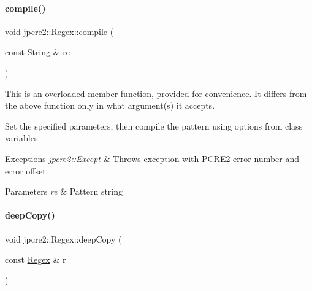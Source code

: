\paragraph{\texorpdfstring{compile()}{compile()}\hspace{0.1cm}{\footnotesize\ttfamily [5/5]}}
{\footnotesize\ttfamily void jpcre2\+::\+Regex\+::compile (\begin{DoxyParamCaption}\item[{const \hyperlink{namespacejpcre2_a91f03070152fb228bc116c5a737f1d16}{String} \&}]{re }\end{DoxyParamCaption})\hspace{0.3cm}{\ttfamily [inline]}}



This is an overloaded member function, provided for convenience. It differs from the above function only in what argument(s) it accepts. 

Set the specified parameters, then compile the pattern using options from class variables. 
\begin{DoxyExceptions}{Exceptions}
{\em \hyperlink{classjpcre2_1_1Except}{jpcre2\+::\+Except}} & Throws exception with P\+C\+R\+E2 error number and error offset \\
\hline
\end{DoxyExceptions}

\begin{DoxyParams}{Parameters}
{\em re} & Pattern string \\
\hline
\end{DoxyParams}
\hypertarget{classjpcre2_1_1Regex_a240790a0f3d8e97af0a76ad3f882e02a_a240790a0f3d8e97af0a76ad3f882e02a}{}\label{classjpcre2_1_1Regex_a240790a0f3d8e97af0a76ad3f882e02a_a240790a0f3d8e97af0a76ad3f882e02a} 
\paragraph{\texorpdfstring{deep\+Copy()}{deepCopy()}}
{\footnotesize\ttfamily void jpcre2\+::\+Regex\+::deep\+Copy (\begin{DoxyParamCaption}\item[{const \hyperlink{classjpcre2_1_1Regex}{Regex} \&}]{r }\end{DoxyParamCaption})\hspace{0.3cm}{\ttfamily [private]}}



